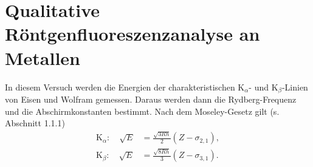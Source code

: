 \section{Qualitative Röntgenfluoreszenzanalyse an Metallen}

In diesem Versuch werden die Energien der charakteristischen K$_{\alpha}$- und K$_{\beta}$-Linien von Eisen und Wolfram gemessen. Daraus werden dann die Rydberg-Frequenz und die Abschirmkonstanten bestimmt.
Nach dem Moseley-Gesetz gilt (s. Abschnitt 1.1.1)
\begin{align}
 \textrm{K}_{\alpha}: \quad \sqrt{E} &= \frac{\sqrt{3Rh}}{2}\left(Z-\sigma_{2,1}\right), \\ 
 \textrm{K}_{\beta}: \quad \sqrt{E} &= \frac{\sqrt{8Rh}}{3}\left(Z-\sigma_{3,1}\right).
\end{align}

